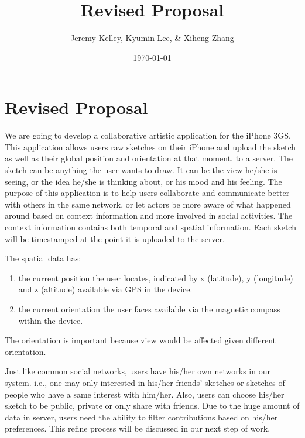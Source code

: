 \documentclass{article}
\begin{document}
\setlength{\parindent}{0pt}
\setlength{\parskip}{.5ex plus 0.5ex minus 0.2ex}




\title{ Revised Proposal }

\author{ Jeremy Kelley, Kyumin Lee, \& Xiheng Zhang }

\date{\today}

\maketitle

\section{Revised Proposal}

We are going to develop a collaborative artistic application for the iPhone 3GS. This application allows users raw sketches on their iPhone and upload the sketch as well as their global position and orientation at that moment, to a server. The sketch can be anything the user wants to draw. It can be the view he/she is seeing, or the idea he/she is thinking about, or his mood and his feeling. The purpose of this application is to help users collaborate and communicate better with others in the same network, or let actors be more aware of what happened around based on context information and more involved in social activities. The context information contains both temporal and spatial information. Each sketch will be timestamped at the point it is uploaded to the server.

The spatial data has:
\begin{enumerate}
\item the current position the user locates, indicated by x (latitude), y (longitude) and z (altitude) available via GPS in the device.
\item the current orientation the user faces available via the magnetic compass within the device.
\end{enumerate}
The orientation is important because view would be affected given different orientation.

Just like common social networks, users have his/her own networks in our system. i.e., one may only interested in his/her friends' sketches or sketches of people who have a same interest with him/her. Also, users can choose his/her sketch to be public, private or only share with friends. Due to the huge amount of data in server, users need the ability to filter contributions based on his/her preferences. This refine process will be discussed in our next step of work.
\end{document}
